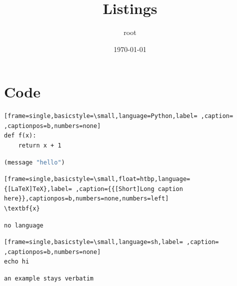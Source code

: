 \documentclass[11pt]{article}
\author{root}
\date{\today}
\title{Listings}
\begin{document}
\maketitle
\tableofcontents

\lstlistoflistings

\section{Code}
\label{sec:org6ca1088}
\begin{lstlisting}[frame=single,basicstyle=\small,language=Python,label= ,caption= ,captionpos=b,numbers=none]
def f(x):
    return x + 1
\end{lstlisting}

\begin{lstlisting}[frame=single,basicstyle=\small,language=Lisp,label=lst:org42e2159,caption={A captioned listing},captionpos=b,numbers=none]
(message "hello")
\end{lstlisting}

\begin{lstlisting}[frame=single,basicstyle=\small,float=htbp,language={[LaTeX]TeX},label= ,caption={{[Short]Long caption here}},captionpos=b,numbers=none,numbers=left]
\textbf{x}
\end{lstlisting}

\begin{verbatim}
no language
\end{verbatim}

\begin{lstlisting}[frame=single,basicstyle=\small,language=sh,label= ,caption= ,captionpos=b,numbers=none]
echo hi
\end{lstlisting}

\begin{verbatim}
an example stays verbatim
\end{verbatim}
\end{document}

